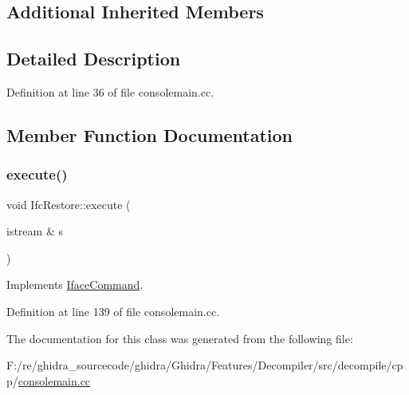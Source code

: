 \subsection*{Additional Inherited Members}


\subsection{Detailed Description}


Definition at line 36 of file consolemain.\+cc.



\subsection{Member Function Documentation}
\mbox{\label{class_ifc_restore_a19a9d5482d3aee44b2e0f548d69a12c4}} 
\subsubsection{\texorpdfstring{execute()}{execute()}}
{\footnotesize\ttfamily void Ifc\+Restore\+::execute (\begin{DoxyParamCaption}\item[{istream \&}]{s }\end{DoxyParamCaption})\hspace{0.3cm}{\ttfamily [virtual]}}



Implements \mbox{\hyperlink{class_iface_command_af10e29cee2c8e419de6efe9e680ad201}{Iface\+Command}}.



Definition at line 139 of file consolemain.\+cc.



The documentation for this class was generated from the following file\+:\begin{DoxyCompactItemize}
\item 
F\+:/re/ghidra\+\_\+sourcecode/ghidra/\+Ghidra/\+Features/\+Decompiler/src/decompile/cpp/\mbox{\hyperlink{consolemain_8cc}{consolemain.\+cc}}\end{DoxyCompactItemize}
